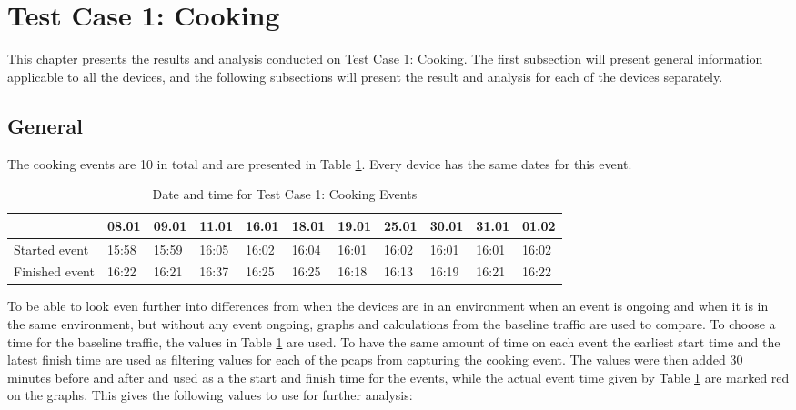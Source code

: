 \section{Test Case 1: Cooking}
This chapter presents the results and analysis conducted on Test Case 1: Cooking. The first subsection will present general information applicable to all the devices, and the following subsections will present the result and analysis for each of the devices separately. 
\subsection{General}
The cooking events are 10 in total and are presented in Table \ref{tab:CookingDates}. Every device has the same dates for this event. 
\begin{table}[!hbtp]
    \centering
    \caption{Date and time for Test Case 1: Cooking Events}
    \begin{adjustbox}{width=1\textwidth}
            \begin{tabular}{l|l|l|l|l|l|l|l|l|l|l|}
            \cline{2-11} & 08.01 & 09.01 & 11.01 & 16.01 & 18.01 & 19.01 & 25.01 & 30.01 & 31.01 & 01.02 \\
            \hline
            \multicolumn{1}{|l|}{Started event}  & 15:58 & 15:59 & 16:05 & 16:02 & 16:04 & 16:01 & 16:02 & 16:01 & 16:01 & 16:02 \\ 
            \hline
            \multicolumn{1}{|l|}{Finished event} & 16:22 & 16:21 & 16:37 & 16:25 & 16:25 & 16:18 & 16:13 & 16:19 & 16:21 & 16:22 \\ \hline
            \end{tabular}
    \end{adjustbox}
    \label{tab:CookingDates}
\end{table}
\FloatBarrier

To be able to look even further into differences from when the devices are in an environment when an event is ongoing and when it is in the same environment, but without any event ongoing, graphs and calculations from the baseline traffic are used to compare. To choose a time for the baseline traffic, the values in Table \ref{tab:CookingDates} are used. To have the same amount of time on each event the earliest start time and the latest finish time are used as filtering values for each of the pcaps from capturing the cooking event. The values were then added 30 minutes before and after and used as a the start and finish time for the events, while the actual event time given by Table \ref{tab:CookingDates} are marked red on the graphs. This gives the following values to use for further analysis:

